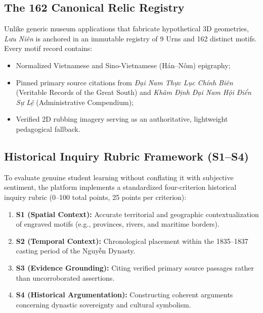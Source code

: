 \documentclass[journal]{IEEEtran}
\begin{document}
\subsection{The 162 Canonical Relic Registry}
Unlike generic museum applications that fabricate hypothetical 3D geometries, \textit{Lưu Niên} is anchored in an immutable registry of 9 Urns and 162 distinct motifs. Every motif record contains:
\begin{itemize}
    \item Normalized Vietnamese and Sino-Vietnamese (Hán--Nôm) epigraphy;
    \item Pinned primary source citations from \textit{Đại Nam Thực Lục Chính Biên} (Veritable Records of the Great South) and \textit{Khâm Định Đại Nam Hội Điển Sự Lệ} (Administrative Compendium);
    \item Verified 2D rubbing imagery serving as an authoritative, lightweight pedagogical fallback.
\end{itemize}

\subsection{Historical Inquiry Rubric Framework (S1--S4)}
To evaluate genuine student learning without conflating it with subjective sentiment, the platform implements a standardized four-criterion historical inquiry rubric (0--100 total points, 25 points per criterion):
\begin{enumerate}
    \item \textbf{S1 (Spatial Context):} Accurate territorial and geographic contextualization of engraved motifs (e.g., provinces, rivers, and maritime borders).
    \item \textbf{S2 (Temporal Context):} Chronological placement within the 1835--1837 casting period of the Nguyễn Dynasty.
    \item \textbf{S3 (Evidence Grounding):} Citing verified primary source passages rather than uncorroborated assertions.
    \item \textbf{S4 (Historical Argumentation):} Constructing coherent arguments concerning dynastic sovereignty and cultural symbolism.
\end{enumerate}
\end{document}
